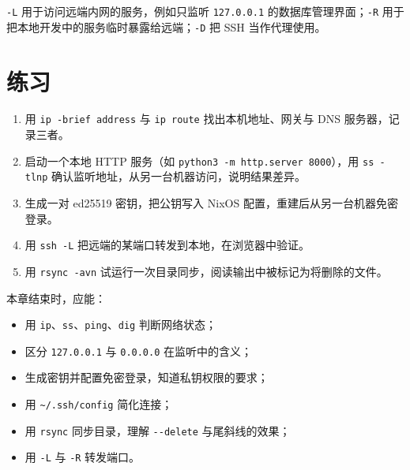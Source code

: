 
\texttt{-L} 用于访问远端内网的服务，例如只监听 \texttt{127.0.0.1} 的数据库管理界面；\texttt{-R} 用于把本地开发中的服务临时暴露给远端；\texttt{-D} 把 SSH 当作代理使用。

\section{练习}

\begin{enumerate}
  \item 用 \texttt{ip -\allowbreak{}brief address} 与 \texttt{ip route} 找出本机地址、网关与 DNS 服务器，记录三者。
  \item 启动一个本地 HTTP 服务（如 \texttt{python3 -\allowbreak{}m http.\allowbreak{}server 8000}），用 \texttt{ss -tlnp} 确认监听地址，从另一台机器访问，说明结果差异。
  \item 生成一对 ed25519 密钥，把公钥写入 NixOS 配置，重建后从另一台机器免密登录。
  \item 用 \texttt{ssh -L} 把远端的某端口转发到本地，在浏览器中验证。
  \item 用 \texttt{rsync -avn} 试运行一次目录同步，阅读输出中被标记为将删除的文件。
\end{enumerate}

\begin{checkpoint}
本章结束时，应能：
\begin{itemize}
  \item 用 \texttt{ip}、\texttt{ss}、\texttt{ping}、\texttt{dig} 判断网络状态；
  \item 区分 \texttt{127.0.0.1} 与 \texttt{0.0.0.0} 在监听中的含义；
  \item 生成密钥并配置免密登录，知道私钥权限的要求；
  \item 用 \texttt{\textasciitilde/.ssh/config} 简化连接；
  \item 用 \texttt{rsync} 同步目录，理解 \texttt{-{}-delete} 与尾斜线的效果；
  \item 用 \texttt{-L} 与 \texttt{-R} 转发端口。
\end{itemize}
\end{checkpoint}
